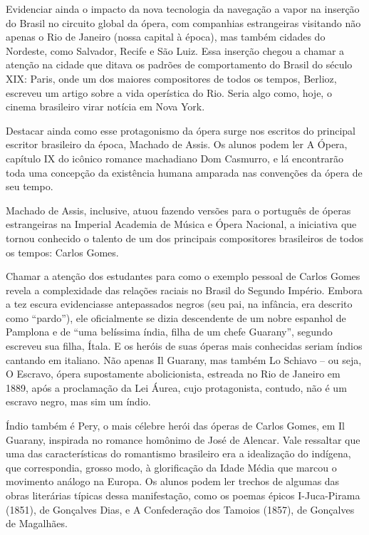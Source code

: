 \documentclass[11pt]{extarticle}
\begin{document}
Evidenciar ainda o impacto da nova tecnologia da navegação a vapor na inserção
do Brasil no circuito global da ópera, com companhias estrangeiras visitando
não apenas o Rio de Janeiro (nossa capital à época), mas também cidades do
Nordeste, como Salvador, Recife e São Luiz. Essa inserção chegou a chamar a
atenção na cidade que ditava os padrões de comportamento do Brasil do século
XIX: Paris, onde um dos maiores compositores de todos os tempos, Berlioz,
escreveu um artigo sobre a vida operística do Rio. Seria algo como, hoje, o
cinema brasileiro virar notícia em Nova York.

Destacar ainda como esse protagonismo da ópera surge nos escritos do principal
escritor brasileiro da época, Machado de Assis. Os alunos podem ler A Ópera,
capítulo IX do icônico romance machadiano Dom Casmurro, e lá encontrarão toda
uma concepção da existência humana amparada nas convenções da ópera de seu
tempo.

Machado de Assis, inclusive, atuou fazendo versões para o português de óperas
estrangeiras na Imperial Academia de Música e Ópera Nacional, a iniciativa que
tornou conhecido o talento de um dos principais compositores brasileiros de
todos os tempos: Carlos Gomes.

Chamar a atenção dos estudantes para como o exemplo pessoal de Carlos Gomes
revela a complexidade das relações raciais no Brasil do Segundo Império. Embora
a tez escura evidenciasse antepassados negros (seu pai, na infância, era
descrito como “pardo”), ele oficialmente se dizia descendente de um nobre
espanhol de Pamplona e de “uma belíssima índia, filha de um chefe Guarany”,
segundo escreveu sua filha, Ítala. E os heróis de suas óperas mais conhecidas
seriam índios cantando em italiano. Não apenas Il Guarany, mas também Lo
Schiavo – ou seja, O Escravo, ópera supostamente abolicionista, estreada no Rio
de Janeiro em 1889, após a proclamação da Lei Áurea, cujo protagonista,
contudo, não é um escravo negro, mas sim um índio.

Índio também é Pery, o mais célebre herói das óperas de Carlos Gomes, em Il
Guarany, inspirada no romance homônimo de José de Alencar. Vale ressaltar que
uma das características do romantismo brasileiro era a idealização do indígena,
que correspondia, grosso modo, à glorificação da Idade Média que marcou o
movimento análogo na Europa. Os alunos podem ler trechos de algumas das obras
literárias  típicas dessa manifestação, como os poemas épicos I-Juca-Pirama
(1851), de Gonçalves Dias, e A Confederação dos Tamoios (1857), de Gonçalves de
Magalhães.
\end{document}
